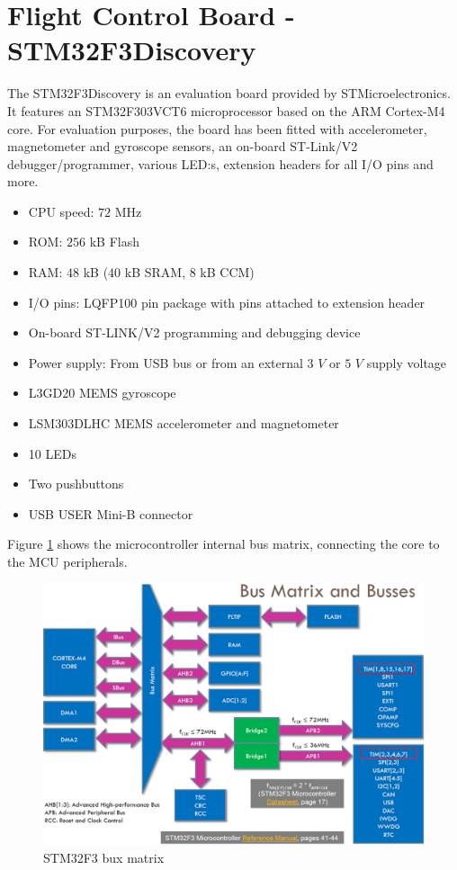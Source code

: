 \documentclass[a4paper]{report}
\begin{document}
	\section{Flight Control Board - STM32F3Discovery}
The STM32F3Discovery is an evaluation board provided by STMicroelectronics. It features an STM32F303VCT6 microprocessor based on the ARM Cortex-M4 core. For evaluation purposes, the board has been fitted with accelerometer, magnetometer and gyroscope sensors, an on-board ST-Link/V2 debugger/programmer, various LED:s, extension headers for all I/O pins and more.

\begin{itemize}
  \item CPU speed: $72$ MHz
  \item ROM: $256$ kB Flash
  \item RAM: $48$ kB ($40$ kB SRAM, $8$ kB CCM)
  \item I/O pins: LQFP100 pin package with pins attached to extension header
  \item On-board ST-LINK/V2 programming and debugging device
  \item Power supply: From USB bus or from an external $3$ $V$ or $5$ $V$ supply voltage
  \item L3GD20 MEMS gyroscope
  \item LSM303DLHC MEMS accelerometer and magnetometer
  \item 10 LEDs
  \item Two pushbuttons
  \item USB USER Mini-B connector
\end{itemize}

Figure \ref{fig:stm32f3busmatrix} shows the microcontroller internal bus matrix, connecting the core to the MCU peripherals.

\begin{figure}[h]
    \centering
    \includegraphics[scale=0.4]{images/stm32_busmatrix.png}
    \caption{STM32F3 bux matrix}
    \label{fig:stm32f3busmatrix}
\end{figure}
\end{document}
